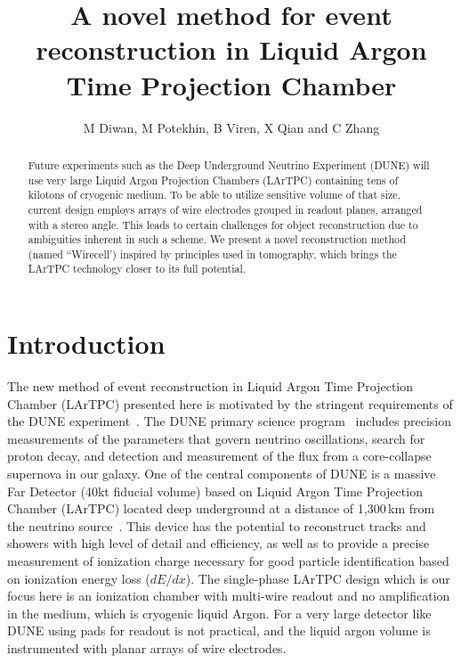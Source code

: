 \documentclass[a4paper]{jpconf}
\begin{document}
\title{A novel method for event reconstruction in Liquid Argon Time Projection Chamber}

\author{M Diwan, M Potekhin, B Viren, X Qian and C Zhang}

\address{Brookhaven National Laboratory, Upton, NY11973, USA}



\begin{abstract}
Future experiments such as the Deep Underground Neutrino Experiment (DUNE) will use very large
Liquid Argon Projection Chambers (LArTPC) containing tens of kilotons of cryogenic medium. To be able to utilize
sensitive volume  of that size, current design employs arrays of wire electrodes
grouped in readout planes, arranged with a stereo angle. This leads to certain challenges for object reconstruction
due to ambiguities inherent in such a scheme. We present a novel reconstruction method (named ``Wirecell')
inspired by principles used in tomography, which brings the LArTPC technology closer to its full potential.
\end{abstract}

\section{Introduction}

The new method of event reconstruction in Liquid Argon Time Projection Chamber (LArTPC) presented here
is motivated by the stringent requirements of the DUNE experiment~\cite{cdrVol1}. The DUNE primary science
program~\cite{cdrVol2} includes precision measurements of the parameters that govern neutrino oscillations,
search for proton decay, and detection and measurement of the  flux from a core-collapse supernova in our galaxy.
One of the central components of DUNE is a massive Far Detector (40kt fiducial volume) based on Liquid Argon Time Projection Chamber (LArTPC)
located deep underground at a distance of 1,300\,km from the neutrino source~\cite{cdrVol4}.
This device  has the potential to reconstruct tracks and showers with  high level of detail and  efficiency,
as well as to provide a precise measurement of ionization charge necessary for good particle identification based on ionization energy loss ($dE/dx$).
The single-phase LArTPC design which is our focus here is an ionization chamber with multi-wire readout and no amplification in the medium,
which is cryogenic liquid Argon.  For a very large detector like DUNE using pads for readout is not practical, and the liquid argon volume is
instrumented with planar arrays of wire electrodes.
\end{document}
